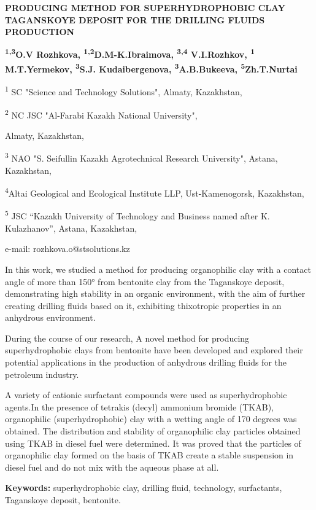 \begin{center}
{\large\bfseries PRODUCING METHOD FOR SUPERHYDROPHOBIC CLAY TAGANSKOYE DEPOSIT
FOR THE DRILLING FLUIDS PRODUCTION}

{\bfseries \textsuperscript{1,3}O.V Rozhkova\envelope,
\textsuperscript{1,2}D.M-K.Ibraimova, \textsuperscript{3,4} V.I.Rozhkov,
\textsuperscript{1} M.T.Yermekov, \textsuperscript{3}S.J. Kudaibergenova,
\textsuperscript{3}A.B.Bukeeva, \textsuperscript{5}Zh.T.Nurtai}

\textsuperscript{1} SC "Science and Technology Solutions", Almaty,
Kazakhstan,

\textsuperscript{2} NC JSC "Al-Farabi Kazakh National University",

Almaty, Kazakhstan,

\textsuperscript{3} NAO "S. Seifullin Kazakh Agrotechnical Research
University", Astana, Kazakhstan,

\textsuperscript{4}Altai Geological and Ecological Institute LLP,
Ust-Kamenogorsk, Kazakhstan,

\textsuperscript{5} JSC ``Kazakh University of Technology and Business
named after K. Kulazhanov'', Astana, Kazakhstan,

e-mail: rozhkova.o@stsolutions.kz
\end{center}

In this work, we studied a method for producing organophilic clay with a
contact angle of more than 150° from bentonite clay from the Taganskoye
deposit, demonstrating high stability in an organic environment, with
the aim of further creating drilling fluids based on it, exhibiting
thixotropic properties in an anhydrous environment.

During the course of our research, A novel method for producing
superhydrophobic clays from bentonite have been developed and explored
their potential applications in the production of anhydrous drilling
fluids for the petroleum industry.

A variety of cationic surfactant compounds were used as superhydrophobic
agents.In the presence of tetrakis (decyl) ammonium bromide (TKAB),
organophilic (superhydrophobic) clay with a wetting angle of 170 degrees
was obtained. The distribution and stability of organophilic clay
particles obtained using TKAB in diesel fuel were determined. It was
proved that the particles of organophilic clay formed on the basis of
TKAB create a stable suspension in diesel fuel and do not mix with the
aqueous phase at all.

{\bfseries Keywords:} superhydrophobic clay, drilling fluid, technology,
surfactants, Taganskoye deposit, bentonite.

